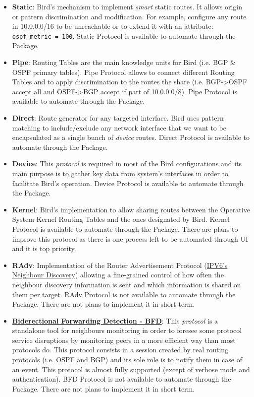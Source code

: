 \begin{itemize}
    \item \textbf{Static}: Bird's mechanism to implement \textit{smart} static routes. It allows  origin or pattern discrimination and modification. For example, configure any route in 10.0.0.0/16 to be unreachable or to extend it with an attribute: \texttt{ospf\_metric = 100}.
    Static Protocol is available to automate through the Package.
    \item \textbf{Pipe}: Routing Tables are the main knowledge units for Bird (i.e. BGP \& OSPF primary tables). Pipe Protocol allows to connect different Routing Tables and to apply discrimination to the routes the share (i.e. BGP->OSPF accept all and OSPF->BGP accept if part of 10.0.0.0/8).
    Pipe Protocol is available to automate through the Package.
    \item \textbf{Direct}: Route generator for any targeted interface. Bird uses pattern matching to include/exclude any network interface that we want to be encapsulated as a single bunch of \textit{device} routes.
    Direct Protocol is available to automate through the Package.
    \item \textbf{Device}: This \textit{protocol} is required in most of the Bird configurations and its main purpose is to gather key data from system's interfaces in order to facilitate Bird's operation.
    Device Protocol is available to automate through the Package.
    \item \textbf{Kernel}: Bird's implementation to allow sharing routes between the Operative System Kernel Routing Tables and the ones designated by Bird.
    Kernel Protocol is available to automate through the Package. There are plans to improve this protocol as there is one process left to be automated through UI and it is top priority.
    \item \textbf{RAdv}: Implementation of the Router Advertisement Protocol (\href{https://tools.ietf.org/html/rfc4861}{IPV6's Neighbour Discovery}) allowing a fine-grained control of how often the neighbour discovery information is sent and which information is shared on them per target.
    RAdv Protocol is not available to automate through the Package. There are not plans to implement it in short term.
    \item \textbf{\href{https://www.rfc-editor.org/rfc/rfc5880.txt}{Biderectional Forwarding Detection - BFD}}: This \textit{protocol} is a standalone tool for neighbours monitoring in order to foresee some protocol service disruptions by monitoring peers in a more efficient way than most protocols do. This protocol consists in a session created by real routing protocols (i.e. OSPF and BGP) and its sole role is to notify them in case of an event. This protocol is almost fully supported (except of verbose mode and authentication).
    BFD Protocol is not available to automate through the Package. There are not plans to implement it in short term.
\end{itemize}

